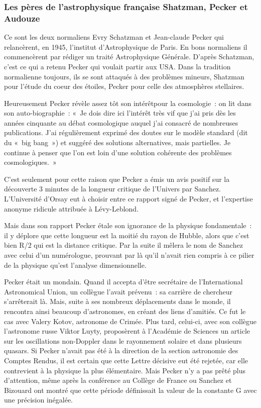 \documentclass[a4paper,12pt]{article}
\begin{document}
\subsubsection{Les pères de l’astrophysique française Shatzman, Pecker et Audouze}
        Ce sont les deux normaliens Evry Schatzman et Jean-claude Pecker qui relancèrent, en 1945, l’institut d’Astrophysique de Paris. 
         En bons normaliens il commencèrent par rédiger un traité Astrophysique Générale. D’après Schatzman, c’est ce qui a retenu Pecker qui voulait partir aux USA. 
            Dans la tradition normalienne toujours, ils se sont attaqués à des problèmes mineurs, Shatzman pour l’étude du coeur des étoiles, Pecker pour celle des atmosphères stellaires.

Heureusement Pecker révèle assez tôt son intérêtpour la cosmologie : on lit dans son auto-biographie : « Je dois dire ici l'intérêt très vif que j'ai pris dès les années cinquante au débat cosmologique auquel j'ai consacré de nombreuses publications. J'ai régulièrement exprimé des doutes sur le modèle standard (dit du « big bang ») et suggéré des solutions alternatives, mais partielles. Je continue à penser que l'on est loin d'une solution cohérente des problèmes cosmologiques. »

C’est seulement pour cette raison que Pecker a émis un avis positif sur la découverte 3 minutes de la longueur critique de l’Univers par Sanchez. L’Université d’Orsay eut à choisir entre ce rapport signé de Pecker, et l’expertise anonyme ridicule attribuée à Lévy-Leblond.

Mais dans son rapport Pecker étale son ignorance de la physique fondamentale : il y déplore que cette longueur est la moitié du rayon de Hubble, alors que c’est bien R/2 qui est la distance critique. Par la suite il m\^elera le nom de Sanchez avec celui d’un numérologue, prouvant par là qu’il n’avait rien compris à ce pilier de la  physique qu’est l’analyse dimensionnelle.

Pecker était un mondain. Quand il accepta d’être secrétaire de l’International Astronomical Union, un collègue l’avait prévenu : sa carrière de chercheur s’arrêterait là. Mais, suite à ses nombreux déplacements dans le monde, il rencontra ainsi beaucoup d’astronomes, en créant des liens d’amitiés. Ce fut le cas avec Valery Kotov, astronome de Crimée. Plus tard, celui-ci, avec son collègue l’astronome russe Viktor Luyty, proposèrent à l’Académie de Sciences un article sur les oscillations non-Doppler dans le rayonnement solaire et dans plusieurs quasars. Si Pecker n’avait pas été à la direction de la section astronomie des Comptes Rendus, il est certain que cette Lettre décisive eut été rejetée, car elle contrevient à la physique la plus élémentaire. Mais Pecker n’y a pas prêté plus d’attention, même après la conférence au Collège de France ou Sanchez et Bizouard ont montré que cette période définissait la valeur de la constante G avec une précision inégalée.
\end{document}
